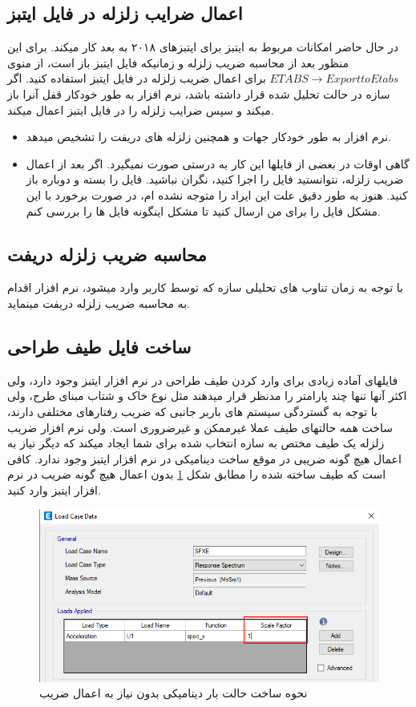 \subsection{اعمال ضرایب زلزله در فایل ایتبز}
در حال حاضر امکانات مربوط به ایتبز برای ایتبزهای ۲۰۱۸ به بعد کار میکند. برای این منظور بعد از محاسبه ضریب زلزله و زمانیکه فایل ایتبز باز است، از منوی
$ETABS \rightarrow Export to Etabs$
برای اعمال ضریب زلزله در فایل ایتبز استفاده کنید. اگر سازه در حالت تحلیل شده قرار داشته باشد، نرم افزار به طور خودکار قفل آنرا باز میکند و سپس ضرایب زلزله را در فایل ایتبز اعمال میکند.

\begin{itemize}
    \item نرم افزار به طور خودکار جهات  و همچنین زلزله های دریفت را تشخیص میدهد.
    \item گاهی اوقات در بعضی از فایلها این کار به درستی صورت نمیگیرد. اگر بعد از اعمال ضریب زلزله، نتوانستید فایل را اجرا کنید، نگران نباشید. فایل را بسته و دوباره باز کنید. هنوز به طور دقیق علت این ایراد را متوجه نشده ام، در صورت برخورد با این مشکل فایل را برای من ارسال کنید تا مشکل اینگونه فایل ها را بررسی کنم.
\end{itemize}

\subsection{محاسبه ضریب زلزله دریفت}
با توجه به زمان تناوب های تحلیلی سازه که توسط کاربر وارد میشود، نرم افزار اقدام به محاسبه ضریب زلزله دریفت مینماید. 

\subsection{ساخت فایل طیف طراحی}
فایلهای آماده زیادی برای وارد کردن طیف طراحی در نرم افزار ایتبز وجود دارد، ولی اکثر آنها تنها چند پارامتر را مدنظر قرار میدهند مثل نوع خاک و شتاب مبنای طرح، ولی با توجه به گستردگی سیستم های باربر جانبی که ضریب رفتارهای مختلفی دارند،
ساخت همه حالتهای طیف عملا غیرممکن و غیرضروری است. ولی نرم افزار ضریب زلزله یک طیف مختص به سازه انتخاب شده برای شما ایجاد میکند که دیگر نیاز به اعمال هیچ گونه ضریبی در موقع ساخت
دینامیکی  در نرم افزار ایتبز وجود ندارد.
کافی است که طیف ساخته شده را مطابق شکل 
\ref{pic:spec_scale}
بدون اعمال هیچ گونه ضریب در نرم افزار ایتبز وارد کنید.

\begin{figure}[H]
    \centering
    \includegraphics[scale=.7]{figures/spec_scale.png}
    \caption{نحوه ساخت حالت بار دینامیکی بدون نیاز به اعمال ضریب}
    \label{pic:spec_scale}
\end{figure}

